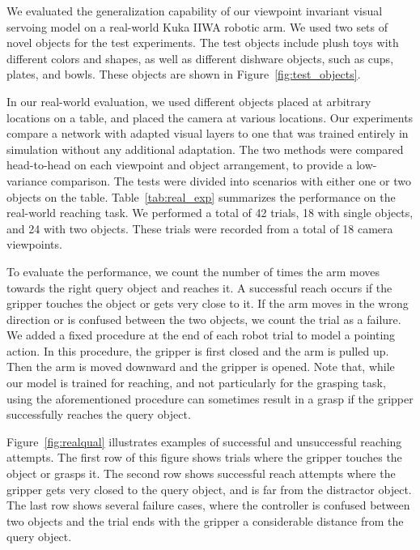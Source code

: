 \documentclass[10pt,twocolumn,letterpaper]{article}
\begin{document}
We evaluated the generalization capability of our viewpoint invariant visual servoing model on a real-world Kuka IIWA robotic arm. We used two sets of novel objects for the test experiments. The test objects include plush toys with different colors and shapes, as well as different dishware objects, such as cups, plates, and bowls. These objects are shown in Figure~\ref{fig:test_objects}.

 In our real-world evaluation, we used different objects placed at arbitrary locations on a table, and placed the camera at various locations. Our experiments compare a network with adapted visual layers to one that was trained entirely in simulation without any additional adaptation. The two methods were compared head-to-head on each viewpoint and object arrangement, to provide a low-variance comparison. The tests were divided into scenarios with either one or two objects on the table. Table~\ref{tab:real_exp} summarizes the performance on the real-world reaching task. We performed a total of 42 trials, 18 with single objects, and 24 with two objects. These trials were recorded from a total of 18 camera viewpoints.

To evaluate the performance, we count the number of times the arm moves towards the right query object and reaches it. A successful reach occurs if the gripper touches the object or gets very close to it. If the arm moves in the wrong direction or is confused between the two objects, we count the trial as a failure. We added a fixed procedure at the end of each robot trial to model a pointing action. In this procedure, the gripper is first closed and the arm is pulled up. Then the arm is moved downward and the gripper is opened. Note that, while our model is trained for reaching, and not particularly for the grasping task, using the aforementioned procedure can sometimes result in a grasp if the gripper successfully reaches the query object.   

Figure~\ref{fig:realqual} illustrates examples of successful and unsuccessful reaching attempts. The first row of this figure shows trials where the gripper touches the object or grasps it. The second row shows successful reach attempts where the gripper gets very closed to the query object, and is far from the distractor object. The last row shows several failure cases, where the controller is confused between two objects and the trial ends with the gripper a considerable distance from the query object.
\end{document}
